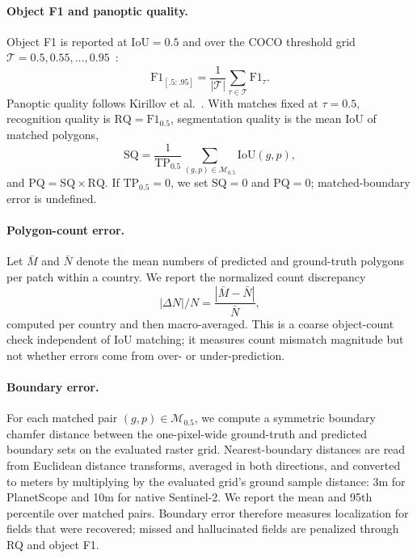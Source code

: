 \documentclass[10pt,twocolumn,letterpaper]{article}
\begin{document}
\paragraph{Object F1 and panoptic quality.}
Object F1 is reported at IoU$=0.5$ and over the COCO threshold grid $\mathcal{T}={0.5,0.55,\ldots,0.95}$~\cite{lin2014coco}:
\begin{equation}
\mathrm{F1}_{[.5:.95]}=
\frac{1}{|\mathcal{T}|}
\sum_{\tau\in\mathcal{T}}\mathrm{F1}_{\tau}.
\end{equation}
Panoptic quality follows Kirillov et al.~\cite{kirillov2019panoptic}. With matches fixed at $\tau=0.5$, recognition quality is $\mathrm{RQ}=\mathrm{F1}_{0.5}$, segmentation quality is the mean IoU of matched polygons,
\begin{equation}
\mathrm{SQ}=
\frac{1}{\mathrm{TP}_{0.5}}
\sum_{(g,p)\in\mathcal{M}_{0.5}}
\mathrm{IoU}(g,p),
\end{equation}
and $\mathrm{PQ}=\mathrm{SQ}\times\mathrm{RQ}$. If $\mathrm{TP}_{0.5}=0$, we set $\mathrm{SQ}=0$ and $\mathrm{PQ}=0$; matched-boundary error is undefined.

\paragraph{Polygon-count error.}
Let $\bar{M}$ and $\bar{N}$ denote the mean numbers of predicted and ground-truth polygons per patch within a country. We report the normalized count discrepancy
\begin{equation}
|\Delta N|/N=
\frac{|\bar{M}-\bar{N}|}{\bar{N}},
\end{equation}
computed per country and then macro-averaged. This is a coarse object-count check independent of IoU matching; it measures count mismatch magnitude but not whether errors come from over- or under-prediction.

\paragraph{Boundary error.}
For each matched pair $(g,p)\in\mathcal{M}_{0.5}$, we compute a symmetric boundary chamfer distance between the one-pixel-wide ground-truth and predicted boundary sets on the evaluated raster grid. Nearest-boundary distances are read from Euclidean distance transforms, averaged in both directions, and converted to meters by multiplying by the evaluated grid's ground sample distance: 3m for PlanetScope and 10m for native Sentinel-2. We report the mean and 95th percentile over matched pairs. Boundary error therefore measures localization for fields that were recovered; missed and hallucinated fields are penalized through RQ and object F1.
\end{document}
